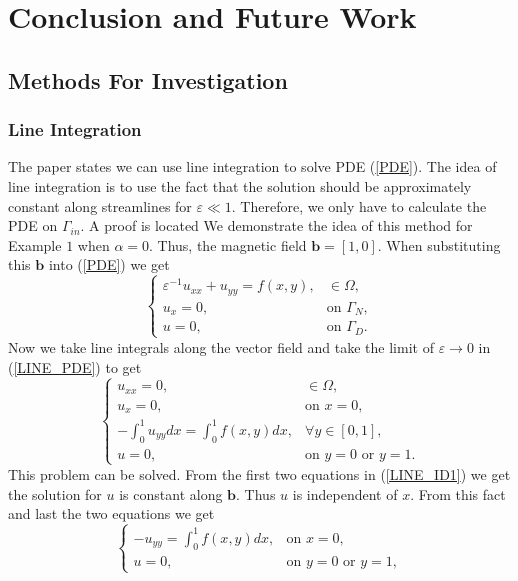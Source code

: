 \documentclass[12pt]{ociamthesis}
\begin{document}
\chapter{Conclusion and Future Work}

\section{Methods For Investigation}

\subsection{Line Integration}
The paper \cite{LINE_INT} states we can use line integration to solve PDE (\ref{PDE}).  The idea of line integration is to use the fact that the solution should be approximately constant along streamlines for $\varepsilon \ll 1$. Therefore, we only have to calculate the PDE on $\Gamma_{in}$. A proof is located 
We demonstrate the idea of this method for Example $1$ when $\alpha=0$. Thus, the magnetic field $\mathbf{b} = [1, 0]$. When substituting this $\mathbf{b}$ into (\ref{PDE}) we get 
\begin{equation} \label{LINE_PDE}
\begin{cases}
\varepsilon^{-1}u_{xx} + u_{yy} = f(x,y), &\in \Omega,\\
u_x = 0, &\text{on } \Gamma_{N},\\
u = 0, &\text{on } \Gamma_{D}.
\end{cases}
\end{equation}
Now we take line integrals along the vector field and take the limit of $\varepsilon \rightarrow 0$ in (\ref{LINE_PDE}) to get
\begin{equation} \label{LINE_ID1}
\begin{cases}
u_{xx} = 0, &\in \Omega,\\
u_{x} = 0, & \text{on }x=0,\\
-\int_0^1 u_{yy} dx = \int_0^1f(x,y)dx, &\forall y \in [0,1],\\
u = 0, &\text{on } y=0 \text{ or } y=1.
\end{cases}
\end{equation}
This problem can be solved. From the first two equations in (\ref{LINE_ID1}) we get the solution for $u$ is constant along $\mathbf{b}$. Thus $u$ is independent of $x$. From this fact and last the two equations we get
\begin{equation}
\begin{cases}
-u_{yy} =\int_0^1 f(x, y) dx, &\text{on } x=0,\\
u = 0, &\text{on } y=0 \text{ or } y=1,
\end{cases}
\end{equation}
\end{document}
